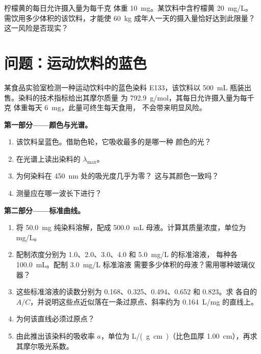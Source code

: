 \begin{exercise}[$\star\star\star$]\label{exo:g11:absorbance:15}
柠檬黄的每日允许摄入量为每千克
体重 \qty{10}{mg}。某饮料中含柠檬黄 \qty{20}{mg/L}。
需饮用多少体积的该饮料，才能使 \qty{60}{kg} 成年人一天的摄入量恰好达到此限量？
这一风险是否现实？
\end{exercise}

\section{问题：运动饮料的蓝色}


\begin{problem}
\label{pb:g11:absorbance:1}
某食品实验室检测一种运动饮料中的蓝色染料 E133，该饮料以
\qty{500}{mL} 瓶装出售。染料的技术指标给出其摩尔质量
为 \qty{792.9}{g/mol}，其每日允许摄入量为每千克
体重每天 \qty{6}{mg}，此量可终生每天食用，
不会带来明显风险。

\medskip
\noindent\textbf{第一部分——颜色与光谱。}
\begin{enumerate}
  \item 该饮料呈蓝色。借助色轮，它吸收最多的是哪一种
        颜色的光？
  \item 在光谱上读出染料的 $\lambda_{\max}$。
  \item 为何染料在 \qty{450}{nm} 处的吸光度几乎为零？
        这与其颜色一致吗？
  \item 测量应在哪一波长下进行？
\end{enumerate}

\medskip
\noindent\textbf{第二部分——标准曲线。}
\begin{enumerate}[resume]
  \item 将 \qty{50.0}{mg} 纯染料溶解，配成 \qty{500.0}{mL}
        母液。计算其质量浓度，单位为 \si{mg/L}。
  \item 配制浓度分别为 1.0、2.0、3.0、4.0 和 \qty{5.0}{mg/L} 的标准溶液，
        每种各 \qty{100.0}{mL}。配制 \qty{3.0}{mg/L} 标准溶液
        需要多少体积的母液？需用哪种玻璃仪器？
  \item 这些标准溶液的读数分别为 0.168、0.325、0.494、0.652 和 0.823。求
        各自的 $A / C$，并说明这些点近似落在一条过原点、斜率约为
        \qty{0.164}{L/mg} 的直线上。
  \item 为何该直线必须过原点？
  \item 由此推出该染料的吸收率 $a$，单位为 \si{L/(g.cm)}（比色皿厚
        \qty{1.00}{cm}），再求其摩尔吸光系数。
\end{enumerate}


\end{problem}
